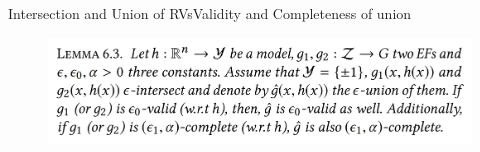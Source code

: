 \documentclass[10pt, aspectratio=169]{beamer}
\begin{document}
	\begin{frame}{Intersection and Union of RVs}{Validity and Completeness of union}
		\begin{figure}
			\centering
			\includegraphics[width=0.9\linewidth]{screenshot003}
		\end{figure}
		
	\end{frame}
	
\end{document}
